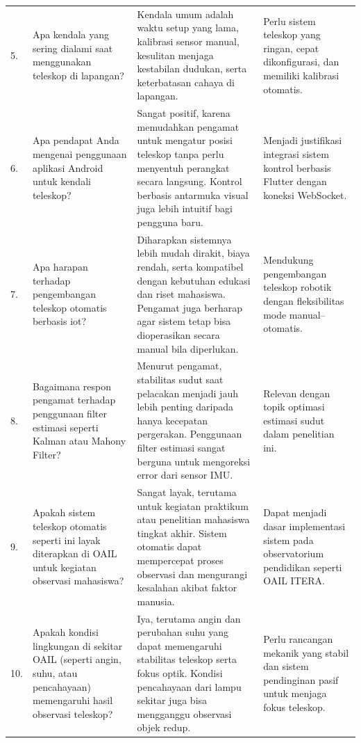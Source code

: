 \begin{longtable}{| b{} | p{} | p{} | p{} |}
	5. & Apa kendala yang sering dialami saat menggunakan teleskop di lapangan? &
	Kendala umum adalah waktu setup yang lama, kalibrasi sensor manual, kesulitan menjaga kestabilan dudukan, serta keterbatasan cahaya di lapangan. &
	Perlu sistem teleskop yang ringan, cepat dikonfigurasi, dan memiliki kalibrasi otomatis. \\
	
	6. & Apa pendapat Anda mengenai penggunaan aplikasi Android untuk kendali teleskop? &
	Sangat positif, karena memudahkan pengamat untuk mengatur posisi teleskop tanpa perlu menyentuh perangkat secara langsung. Kontrol berbasis antarmuka visual juga lebih intuitif bagi pengguna baru. &
	Menjadi justifikasi integrasi sistem kontrol berbasis Flutter dengan koneksi WebSocket. \\
	\hline
	
	7. & Apa harapan terhadap pengembangan teleskop otomatis berbasis iot? &
	Diharapkan sistemnya lebih mudah dirakit, biaya rendah, serta kompatibel dengan kebutuhan edukasi dan riset mahasiswa. Pengamat juga berharap agar sistem tetap bisa dioperasikan secara manual bila diperlukan. &
	Mendukung pengembangan teleskop robotik dengan fleksibilitas mode manual–otomatis. \\
	\hline
	
	8. & Bagaimana respon pengamat terhadap penggunaan filter estimasi seperti Kalman atau Mahony Filter? &
	Menurut pengamat, stabilitas sudut saat pelacakan menjadi jauh lebih penting daripada hanya kecepatan pergerakan. Penggunaan filter estimasi sangat berguna untuk mengoreksi error dari sensor IMU. &
	Relevan dengan topik optimasi estimasi sudut dalam penelitian ini. \\
	\hline
	
	9. & Apakah sistem teleskop otomatis seperti ini layak diterapkan di OAIL untuk kegiatan observasi mahasiswa? &
	Sangat layak, terutama untuk kegiatan praktikum atau penelitian mahasiswa tingkat akhir. Sistem otomatis dapat mempercepat proses observasi dan mengurangi kesalahan akibat faktor manusia. &
	Dapat menjadi dasar implementasi sistem pada observatorium pendidikan seperti OAIL ITERA. \\
	\hline
	10. & Apakah kondisi lingkungan di sekitar OAIL (seperti angin, suhu, atau pencahayaan) memengaruhi hasil observasi teleskop? &
	Iya, terutama angin dan perubahan suhu yang dapat memengaruhi stabilitas teleskop serta fokus optik. Kondisi pencahayaan dari lampu sekitar juga bisa mengganggu observasi objek redup. &
	Perlu rancangan mekanik yang stabil dan sistem pendinginan pasif untuk menjaga fokus teleskop. \\
	\hline
	

\end{longtable}
